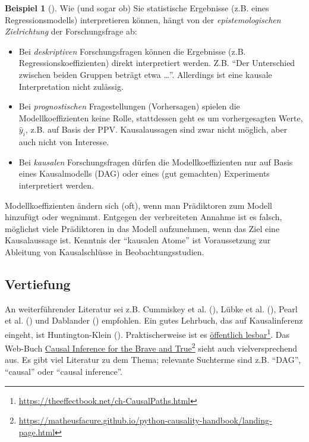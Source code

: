 \documentclass[
  ngerman,
  letterpaper,
  twoside,
  open=any]{scrbook}
\providecommand{\tightlist}{%
  \setlength{\itemsep}{0pt}\setlength{\parskip}{0pt}}\usepackage{longtable,booktabs,array}
\theoremstyle{definition}
\newtheorem{example}{Beispiel}[chapter]
\theoremstyle{plain}
\theoremstyle{definition}
\theoremstyle{definition}
\theoremstyle{remark}
\begin{document}
\begin{example}[]
Wie (und sogar ob) Sie statistische Ergebnisse (z.B. eines
Regressionsmodells) interpretieren können, hängt von der
\emph{epistemologischen Zielrichtung} der Forschungsfrage ab:

\begin{itemize}
\tightlist
\item
  Bei \emph{deskriptiven} Forschungsfragen können die Ergebnisse (z.B.
  Regressionskoeffizienten) direkt interpretiert werden. Z.B.
  \enquote{Der Unterschied zwischen beiden Gruppen beträgt etwa
  \ldots{}}. Allerdings ist eine kausale Interpretation nicht zulässig.
\item
  Bei \emph{prognostischen} Fragestellungen (Vorhersagen) spielen die
  Modellkoeffizienten keine Rolle, stattdessen geht es um vorhergesagten
  Werte, \(\hat{y}_i\), z.B. auf Basis der PPV. Kausalaussagen sind zwar
  nicht möglich, aber auch nicht von Interesse.
\item
  Bei \emph{kausalen} Forschungsfragen dürfen die Modellkoeffizienten
  nur auf Basis eines Kausalmodells (DAG) oder eines (gut gemachten)
  Experiments interpretiert werden.
\end{itemize}

Modellkoeffizienten ändern sich (oft), wenn man Prädiktoren zum Modell
hinzufügt oder wegnimmt. Entgegen der verbreiteten Annahme ist es
falsch, möglichst viele Prädiktoren in das Modell aufzunehmen, wenn das
Ziel eine Kausalaussage ist. Kenntnis der \enquote{kausalen Atome} ist
Voraussetzung zur Ableitung von Kausalschlüsse in Beobachtungsstudien.

\subsection{Vertiefung}\label{vertiefung-7}

An weiterführender Literatur sei z.B. Cummiskey et al.
(), Lübke et al.
(), Pearl et al.
() und Dablander
() empfohlen. Ein gutes Lehrbuch, das
auf Kausalinferenz eingeht, ist Huntington-Klein
(). Praktischerweise ist es
\href{https://theeffectbook.net/ch-CausalPaths.html}{öffentlich
lesbar}\footnote{\url{https://theeffectbook.net/ch-CausalPaths.html}}.
Das Web-Buch
\href{https://matheusfacure.github.io/python-causality-handbook/landing-page.html}{Causal
Inference for the Brave and True}\footnote{\url{https://matheusfacure.github.io/python-causality-handbook/landing-page.html}}
sieht auch vielversprechend aus. Es gibt viel Literatur zu dem Thema;
relevante Suchterme sind z.B. \enquote{DAG}, \enquote{causal} oder
\enquote{causal inference}.


\end{example}
\end{document}
